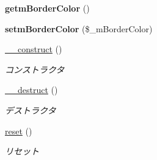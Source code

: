 \begin{DoxyCompactItemize}
{\bfseries getm\+Border\+Color} ()
\item 
\mbox{\label{class_reversi_setting_a59c73e106597e9e52ad6f531f7de2ffd}} 
{\bfseries setm\+Border\+Color} (\$\+\_\+m\+Border\+Color)
\item 
\hyperlink{class_reversi_setting_a095c5d389db211932136b53f25f39685}{\+\_\+\+\_\+construct} ()
\begin{DoxyCompactList}\small\item\em コンストラクタ \end{DoxyCompactList}\item 
\hyperlink{class_reversi_setting_a421831a265621325e1fdd19aace0c758}{\+\_\+\+\_\+destruct} ()
\begin{DoxyCompactList}\small\item\em デストラクタ \end{DoxyCompactList}\item 
\hyperlink{class_reversi_setting_a4a20559544fdf4dcb457e258dc976cf8}{reset} ()
\begin{DoxyCompactList}\small\item\em リセット \end{DoxyCompactList}\end{DoxyCompactItemize}

